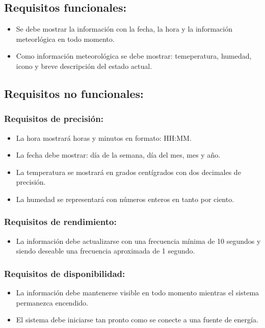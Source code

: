 \subsection{Requisitos funcionales:}
\begin{itemize}
    \item Se debe mostrar la información con la fecha, la hora y la información meteorlógica
    en todo momento.
    \item Como información meteorológica se debe mostrar: temeperatura, humedad, icono
    y breve descripción del estado actual.
\end{itemize}

\subsection{Requisitos no funcionales:}

\subsubsection{Requisitos de precisión:}
\begin{itemize}
    \item La hora mostrará horas y minutos en formato: HH:MM.
    \item La fecha debe mostrar: día de la semana, día del mes, mes y año.
    \item La temperatura se mostrará en grados centígrados con dos decimales de precisión.
    \item La humedad se representará con números enteros en tanto por ciento.
\end{itemize}

\subsubsection{Requisitos de rendimiento:}
\begin{itemize}
    \item La información debe actualizarse con una frecuencia mínima de 10 segundos y
    siendo deseable una frecuencia aproximada de 1 segundo.
\end{itemize}

\subsubsection{Requisitos de disponibilidad:}
\begin{itemize}
    \item La información debe mantenerse visible en todo momento mientras el sistema
    permanezca encendido.
    \item El sistema debe iniciarse tan pronto como se conecte a una fuente de energía.
\end{itemize}

